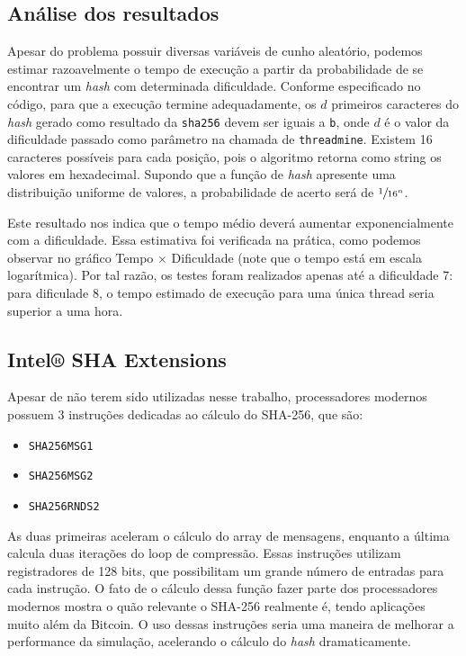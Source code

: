 \documentclass[12pt]{article}
\begin{document}
\subsection{Análise dos resultados}
Apesar do problema possuir diversas variáveis de cunho aleatório,
podemos estimar razoavelmente o tempo de execução
a partir da probabilidade de se encontrar um \textit{hash} com determinada dificuldade.
Conforme especificado no código,
para que a execução termine adequadamente,
os $d$ primeiros caracteres
do \textit{hash} gerado como resultado
da \texttt{sha256} devem ser iguais a \texttt{\textquotesingle{}b\textquotesingle{}},
onde $d$ é o valor da dificuldade
passado como parâmetro na chamada de \texttt{threadmine}.
Existem 16 caracteres possíveis para cada posição,
pois o algoritmo retorna como string os valores em hexadecimal.
Supondo que a função de \textit{hash}
apresente uma distribuição uniforme de valores,
a probabilidade de acerto será de $\sfrac{1}{16^{n}}$.

Este resultado nos indica que o tempo médio
deverá aumentar exponencialmente com a dificuldade.
Essa estimativa foi verificada na prática,
como podemos observar no gráfico Tempo $\times$ Dificuldade
(note que o tempo está em escala logarítmica).
Por tal razão, os testes foram realizados apenas até a dificuldade 7:
para dificulade 8, o tempo estimado de execução
para uma única thread seria superior a uma hora.

\subsection{Intel® SHA Extensions}
Apesar de não terem sido utilizadas nesse trabalho,
processadores modernos possuem 3 instruções
dedicadas ao cálculo do SHA-256, que são:
\begin{itemize}
	\item \texttt{SHA256MSG1}
	\item \texttt{SHA256MSG2}
	\item \texttt{SHA256RNDS2}
\end{itemize}

As duas primeiras aceleram o cálculo
do array de mensagens,
enquanto a última calcula
duas iterações do loop de compressão.
Essas instruções utilizam registradores de 128 bits,
que possibilitam um grande número de entradas para cada instrução.
O fato de o cálculo dessa função fazer parte dos processadores modernos
mostra o quão relevante o SHA-256 realmente é,
tendo aplicações muito além da Bitcoin.
O uso dessas instruções seria uma maneira de
melhorar a performance da simulação,
acelerando o cálculo do \textit{hash} dramaticamente.

\nocite{*}
\printbibliography
\end{document}
